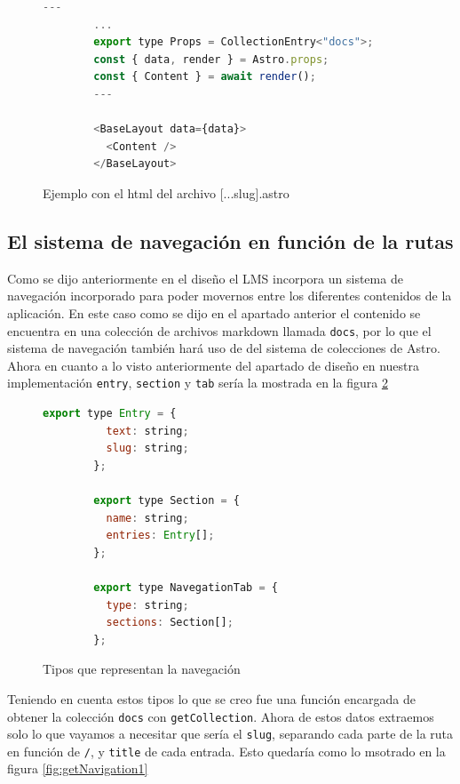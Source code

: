 \begin{figure}
    \begin{lstlisting}[language=Javascript]
        ---
        ...
        export type Props = CollectionEntry<"docs">;
        const { data, render } = Astro.props;
        const { Content } = await render();
        ---
        
        <BaseLayout data={data}>
          <Content />
        </BaseLayout>
    \end{lstlisting}
    \caption{Ejemplo con el html del archivo [...slug].astro}
    \label{fig:adastraMain}
\end{figure}




\subsection{El sistema de navegación en función de la rutas}

Como se dijo anteriormente en el diseño el LMS incorpora un sistema de navegación incorporado para poder movernos entre los diferentes contenidos de la aplicación. En este caso como se dijo en el apartado anterior el contenido se encuentra en una colección de archivos markdown llamada \verb|docs|, por lo que el sistema de navegación también hará uso de del sistema de colecciones de Astro. Ahora en cuanto a lo visto anteriormente del apartado de diseño en nuestra implementación \verb|entry|, \verb|section| y \verb|tab| sería la mostrada en la figura \ref{fig:navTypes}

\begin{figure}
    \begin{lstlisting}[language=Javascript]
        export type Entry = {
          text: string;
          slug: string;
        };
        
        export type Section = {
          name: string;
          entries: Entry[];
        };
        
        export type NavegationTab = {
          type: string;
          sections: Section[];
        };
    \end{lstlisting}
    \caption{Tipos que representan la navegación}
    \label{fig:navTypes}
\end{figure}

Teniendo en cuenta estos tipos lo que se creo fue una función encargada de obtener la colección \verb|docs| con \verb|getCollection|. Ahora de estos datos extraemos solo lo que vayamos a necesitar que sería el \verb|slug|, separando cada parte de la ruta en función de \verb|/|,  y \verb|title| de cada entrada. Esto quedaría como lo msotrado en la figura \ref{fig:getNavigation1}

